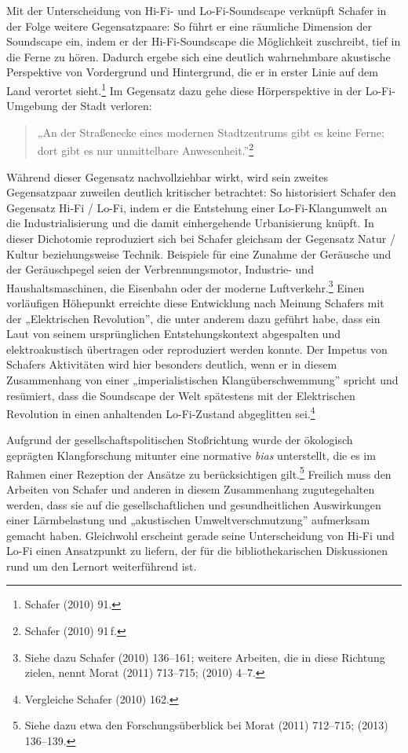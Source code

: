 \documentclass[a4paper,
fontsize=11pt,
oneside,
numbers=noperiodatend,
parskip=half-,
bibliography=totoc,
final
]{scrartcl}
\begin{document}
Mit der Unterscheidung von Hi-Fi- und Lo-Fi-Soundscape verknüpft Schafer
in der Folge weitere Gegensatzpaare: So führt er eine räumliche
Dimension der Soundscape ein, indem er der Hi-Fi-Soundscape die
Möglichkeit zuschreibt, tief in die Ferne zu hören. Dadurch ergebe sich
eine deutlich wahrnehmbare akustische Perspektive von Vordergrund und
Hintergrund, die er in erster Linie auf dem Land verortet
sieht.\footnote{Schafer (2010) 91.} Im Gegensatz dazu gehe diese
Hörperspektive in der Lo-Fi-Umgebung der Stadt verloren:

\begin{quote}
„An der Straßenecke eines modernen Stadtzentrums gibt es keine Ferne;
dort gibt es nur unmittelbare Anwesenheit.''\footnote{Schafer (2010)
  91\,f.}
\end{quote}

Während dieser Gegensatz nachvollziehbar wirkt, wird sein zweites
Gegensatzpaar zuweilen deutlich kritischer betrachtet: So historisiert
Schafer den Gegensatz Hi-Fi / Lo-Fi, indem er die Entstehung einer
Lo-Fi-Klangumwelt an die Industrialisierung und die damit einhergehende
Urbanisierung knüpft. In dieser Dichotomie reproduziert sich bei Schafer
gleichsam der Gegensatz Natur / Kultur beziehungsweise Technik.
Beispiele für eine Zunahme der Geräusche und der Geräuschpegel seien der
Verbrennungsmotor, Industrie- und Haushaltsmaschinen, die Eisenbahn oder
der moderne Luftverkehr.\footnote{Siehe dazu Schafer (2010) 136--161;
  weitere Arbeiten, die in diese Richtung zielen, nennt Morat (2011)
  713--715; (2010) 4--7.} Einen vorläufigen Höhepunkt erreichte diese
Entwicklung nach Meinung Schafers mit der „Elektrischen Revolution'',
die unter anderem dazu geführt habe, dass ein Laut von seinem
ursprünglichen Entstehungskontext abgespalten und elektroakustisch
übertragen oder reproduziert werden konnte. Der Impetus von Schafers
Aktivitäten wird hier besonders deutlich, wenn er in diesem Zusammenhang
von einer „imperialistischen Klangüberschwemmung'' spricht und
resümiert, dass die Soundscape der Welt spätestens mit der Elektrischen
Revolution in einen anhaltenden Lo-Fi-Zustand abgeglitten
sei.\footnote{Vergleiche Schafer (2010) 162.}

Aufgrund der gesellschaftspolitischen Stoßrichtung wurde der ökologisch
geprägten Klangforschung mitunter eine normative \emph{bias}
unterstellt, die es im Rahmen einer Rezeption der Ansätze zu
berücksichtigen gilt.\footnote{Siehe dazu etwa den Forschungsüberblick
  bei Morat (2011) 712--715; (2013) 136--139.} Freilich muss den
Arbeiten von Schafer und anderen in diesem Zusammenhang zugutegehalten
werden, dass sie auf die gesellschaftlichen und gesundheitlichen
Auswirkungen einer Lärmbelastung und „akustischen Umweltverschmutzung''
aufmerksam gemacht haben. Gleichwohl erscheint gerade seine
Unterscheidung von Hi-Fi und Lo-Fi einen Ansatzpunkt zu liefern, der für
die bibliothekarischen Diskussionen rund um den Lernort weiterführend
ist.
\end{document}
